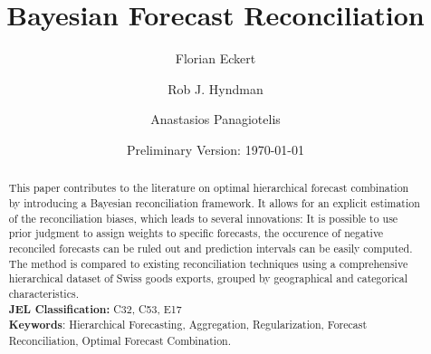 


\title{\huge Bayesian Forecast Reconciliation}

\author[$\dagger$]{Florian Eckert}
\author[$\ddagger$]{Rob J. Hyndman}
\author[$\ddagger$]{Anastasios Panagiotelis}
\date{Preliminary Version: \today}

\maketitle
\begin{abstract}
This paper contributes to the literature on optimal hierarchical forecast combination by introducing a Bayesian reconciliation framework. It allows for an explicit estimation of the reconciliation biases, which leads to several innovations: It is possible to use prior judgment to assign weights to specific forecasts, the occurence of negative reconciled forecasts can be ruled out and prediction intervals can be easily computed. The method is compared to existing reconciliation techniques using a comprehensive hierarchical dataset of Swiss goods exports, grouped by geographical and categorical characteristics.\\

\noindent \textbf{JEL Classification:} C32, C53, E17 \\
\noindent \textbf{Keywords}: Hierarchical Forecasting, Aggregation, Regularization, Forecast Reconciliation, Optimal Forecast Combination.
\end{abstract}
\clearpage









